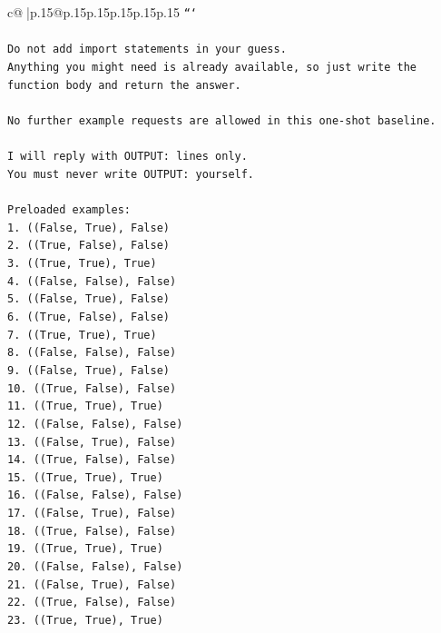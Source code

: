 \documentclass{article}
\begin{document}
{\begin{supertabular}{c@{$\;$}|p{.15\linewidth}@{}p{.15\linewidth}p{.15\linewidth}p{.15\linewidth}p{.15\linewidth}p{.15\linewidth}}
{{{\texttt{```} \\
\\ 
\texttt{Do not add import statements in your guess.} \\
\texttt{Anything you might need is already available, so just write the function body and return the answer.} \\
\\ 
\texttt{No further example requests are allowed in this one{-}shot baseline.} \\
\\ 
\texttt{I will reply with OUTPUT: lines only.} \\
\texttt{You must never write OUTPUT: yourself.} \\
\\ 
\texttt{Preloaded examples:} \\
\texttt{1. ((False, True), False)} \\
\texttt{2. ((True, False), False)} \\
\texttt{3. ((True, True), True)} \\
\texttt{4. ((False, False), False)} \\
\texttt{5. ((False, True), False)} \\
\texttt{6. ((True, False), False)} \\
\texttt{7. ((True, True), True)} \\
\texttt{8. ((False, False), False)} \\
\texttt{9. ((False, True), False)} \\
\texttt{10. ((True, False), False)} \\
\texttt{11. ((True, True), True)} \\
\texttt{12. ((False, False), False)} \\
\texttt{13. ((False, True), False)} \\
\texttt{14. ((True, False), False)} \\
\texttt{15. ((True, True), True)} \\
\texttt{16. ((False, False), False)} \\
\texttt{17. ((False, True), False)} \\
\texttt{18. ((True, False), False)} \\
\texttt{19. ((True, True), True)} \\
\texttt{20. ((False, False), False)} \\
\texttt{21. ((False, True), False)} \\
\texttt{22. ((True, False), False)} \\
\texttt{23. ((True, True), True)} \\
}}}
\end{supertabular}}
\end{document}
